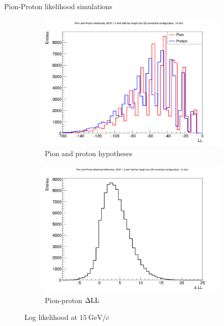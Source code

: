 \documentclass{beamer}
\begin{document}
\begin{frame}{Pion-Proton likelihood simulations}
  \begin{figure}
    \centering
    \vspace{-0.2cm}
    \begin{subfigure}{0.5\textwidth}
      \includegraphics[width = 1.0\textwidth]{Plots/ProtonPionLL15GeVStandardMCPAB.png}
      \caption{Pion and proton hypotheses}
    \end{subfigure}%
    \begin{subfigure}{0.5\textwidth}
      \includegraphics[width = 1.0\textwidth]{Plots/ProtonPionDLL15GeVStandardMCPAB.png}
      \caption{Pion-proton $\Delta{\rm LL}$}
    \end{subfigure}
    \caption{Log likelihood at $\SI{15}{\giga\eV/c}$}
  \end{figure}
\end{frame}
\end{document}
